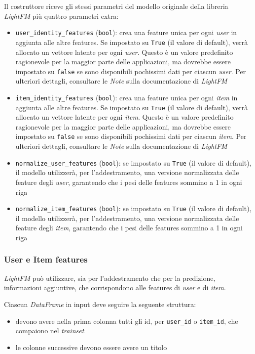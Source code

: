 Il costruttore riceve gli stessi parametri del modello originale della libreria \textit{LightFM} più quattro parametri extra:

\begin{itemize}
    \item \texttt{user\_identity\_features} (\texttt{bool}): crea una feature unica per ogni \textit{user} in aggiunta alle altre features. Se impostato su \texttt{True} (il valore di default), verrà allocato un vettore latente per ogni \textit{user}.  Questo è un valore predefinito ragionevole per la maggior parte delle applicazioni, ma dovrebbe essere impostato su \texttt{false} se sono disponibili pochissimi dati per ciascun \textit{user}. Per ulteriori dettagli, consultare le \textit{Note} sulla documentazione di \textit{LightFM}
    \item \texttt{item\_identity\_features} (\texttt{bool}): crea una feature unica per ogni \textit{item} in aggiunta alle altre features. Se impostato su \texttt{True} (il valore di default), verrà allocato un vettore latente per ogni \textit{item}. Questo è un valore predefinito ragionevole per la maggior parte delle applicazioni, ma dovrebbe essere impostato su \texttt{false} se sono disponibili pochissimi dati per ciascun \textit{item}. Per ulteriori dettagli, consultare le \textit{Note} sulla documentazione di \textit{LightFM}
    \item \texttt{normalize\_user\_features} (\texttt{bool}): se impostato su \texttt{True} (il valore di default), il modello utilizzerà, per l'addestramento, una versione normalizzata delle feature degli \textit{user}, garantendo che i pesi delle features sommino a 1 in ogni riga
    \item \texttt{normalize\_item\_features} (\texttt{bool}): se impostato su \texttt{True} (il valore di default), il modello utilizzerà, per l'addestramento, una versione normalizzata delle feature degli \textit{item}, garantendo che i pesi delle features sommino a 1 in ogni riga
\end{itemize}

\subsubsection{User e Item features}

\textit{LightFM} può utilizzare, sia per l'addestramento che per la predizione, informazioni aggiuntive, che corrispondono alle features di \textit{user} e di \textit{item}. 

Ciascun \textit{DataFrame} in input deve seguire la seguente struttura:
\begin{itemize}
    \item devono avere nella prima colonna tutti gli id, per \texttt{user\_id} o \texttt{item\_id}, che compaiono nel \textit{trainset}
    \item le colonne successive devono essere avere un titolo
\end{itemize}

